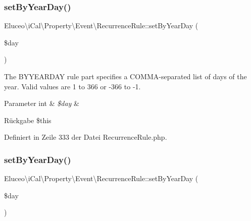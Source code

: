 \subsubsection{\texorpdfstring{set\+By\+Year\+Day()}{setByYearDay()}\hspace{0.1cm}{\footnotesize\ttfamily [1/3]}}
{\footnotesize\ttfamily Eluceo\textbackslash{}i\+Cal\textbackslash{}\+Property\textbackslash{}\+Event\textbackslash{}\+Recurrence\+Rule\+::set\+By\+Year\+Day (\begin{DoxyParamCaption}\item[{}]{\$day }\end{DoxyParamCaption})}

The B\+Y\+Y\+E\+A\+R\+D\+AY rule part specifies a C\+O\+M\+M\+A-\/separated list of days of the year. Valid values are 1 to 366 or -\/366 to -\/1.


\begin{DoxyParams}[1]{Parameter}
int & {\em \$day} & \\
\hline
\end{DoxyParams}
\begin{DoxyReturn}{Rückgabe}
\$this 
\end{DoxyReturn}


Definiert in Zeile 333 der Datei Recurrence\+Rule.\+php.

\mbox{\label{class_eluceo_1_1i_cal_1_1_property_1_1_event_1_1_recurrence_rule_a7e1f459a0be3139aa57b17e3f46d20dc}} 
\subsubsection{\texorpdfstring{set\+By\+Year\+Day()}{setByYearDay()}\hspace{0.1cm}{\footnotesize\ttfamily [2/3]}}
{\footnotesize\ttfamily Eluceo\textbackslash{}i\+Cal\textbackslash{}\+Property\textbackslash{}\+Event\textbackslash{}\+Recurrence\+Rule\+::set\+By\+Year\+Day (\begin{DoxyParamCaption}\item[{}]{\$day }\end{DoxyParamCaption})}

